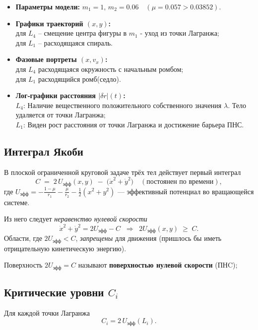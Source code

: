 \documentclass[12pt]{article}
\begin{document}
\begin{itemize}
  \item \textbf{Параметры модели:} $m_1=1$, $m_2=0.06\quad(\mu=0.057>0.03852)$.
  \item \textbf{Графики траекторий $(x,y)$:}\\
        для $L_4$ -- смещение центра фигуры в $m_1$ - уход из точки Лагранжа;\\
        для $L_1$ -- расходящаяся спираль. 
  \item \textbf{Фазовые портреты $(x,v_x)$:}\\
        для $L_4$ расходящаяся окружность с начальным ромбом;\\
        для $L_1$ расходящийся ромб(седло).
  \item \textbf{Лог‑графики расстояния $|\delta r|(t)$:}\\
        $L_4$:  Наличие вещественного положительного собственного значения $\lambda$. Тело удаляется от точки Лагранжа;\\
        $L_1$: Виден рост расстояния от точки Лагранжа и достижение барьера ПНС.
\end{itemize}



\subsection{Интеграл Якоби}

В плоской ограниченной круговой задаче трёх тел действует первый интеграл
\[
C \;=\; 2\,U_{\mathrm{эфф}}(x,y)\;-\;\bigl(\dot x^{2}+\dot y^{2}\bigr)
\quad(\text{постоянен по времени}),
\]
где
\(
U_{\mathrm{эфф}} = -\frac{1-\mu}{r_1}-\frac{\mu}{r_2}-\tfrac12(x^{2}+y^{2})
\)
— эффективный потенциал во вращающейся системе.

Из него следует \emph{неравенство нулевой скорости}
\[
\dot x^{2}+\dot y^{2}=2U_{\mathrm{эфф}}-C \;\;\Longrightarrow\;\;
2U_{\mathrm{эфф}}(x,y)\;\ge\;C .
\]
Области, где $2U_{\mathrm{эфф}}<C$, \emph{запрещены} для движения
(пришлось бы иметь отрицательную кинетическую энергию).

Поверхность $2U_{\mathrm{эфф}}=C$ называют \textbf{поверхностью нулевой скорости} (ПНC);

\subsection{Критические уровни $C_i$}

Для каждой точки Лагранжа
\[
C_i = 2\,U_{\mathrm{эфф}}(L_i).
\]
\end{document}

